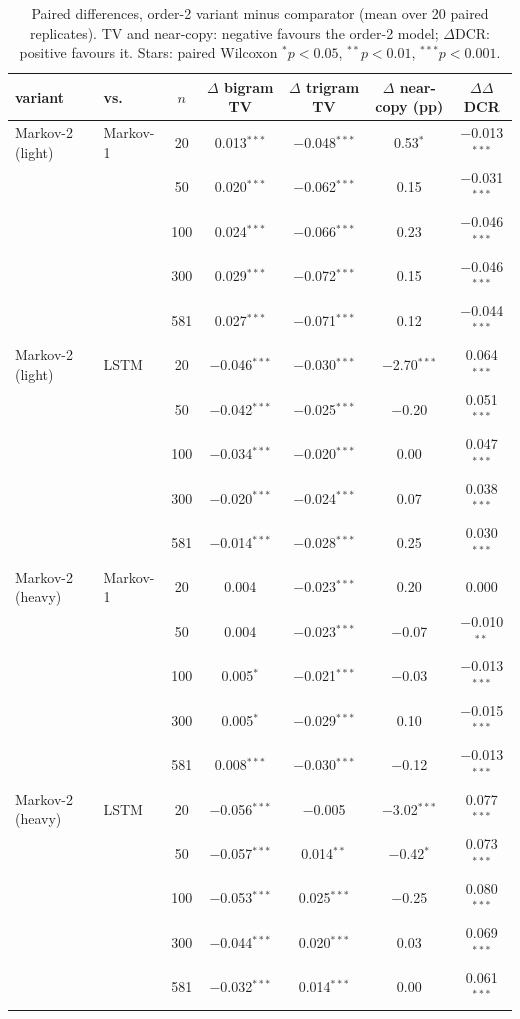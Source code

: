 \begin{table}[!t]
\caption{Paired differences, order-2 variant minus comparator (mean over 20 paired replicates). TV and near-copy: negative favours the order-2 model; $\Delta$DCR: positive favours it. Stars: paired Wilcoxon $^{*}p{<}0.05$, $^{**}p{<}0.01$, $^{***}p{<}0.001$.}
\label{tab:supp-order2-paired}
\centering\small
\begin{tabular}{llccccc}
\toprule
variant & vs. & $n$ & $\Delta$ bigram TV & $\Delta$ trigram TV & $\Delta$ near-copy (pp) & $\Delta\Delta$DCR \\
\midrule
Markov-2 (light) & Markov-1 & 20 & 0.013$^{***}$ & $-$0.048$^{***}$ & 0.53$^{*}$ & $-$0.013$^{***}$ \\
 &  & 50 & 0.020$^{***}$ & $-$0.062$^{***}$ & 0.15 & $-$0.031$^{***}$ \\
 &  & 100 & 0.024$^{***}$ & $-$0.066$^{***}$ & 0.23 & $-$0.046$^{***}$ \\
 &  & 300 & 0.029$^{***}$ & $-$0.072$^{***}$ & 0.15 & $-$0.046$^{***}$ \\
 &  & 581 & 0.027$^{***}$ & $-$0.071$^{***}$ & 0.12 & $-$0.044$^{***}$ \\
\midrule
Markov-2 (light) & LSTM & 20 & $-$0.046$^{***}$ & $-$0.030$^{***}$ & $-$2.70$^{***}$ & 0.064$^{***}$ \\
 &  & 50 & $-$0.042$^{***}$ & $-$0.025$^{***}$ & $-$0.20 & 0.051$^{***}$ \\
 &  & 100 & $-$0.034$^{***}$ & $-$0.020$^{***}$ & 0.00 & 0.047$^{***}$ \\
 &  & 300 & $-$0.020$^{***}$ & $-$0.024$^{***}$ & 0.07 & 0.038$^{***}$ \\
 &  & 581 & $-$0.014$^{***}$ & $-$0.028$^{***}$ & 0.25 & 0.030$^{***}$ \\
\midrule
Markov-2 (heavy) & Markov-1 & 20 & 0.004 & $-$0.023$^{***}$ & 0.20 & 0.000 \\
 &  & 50 & 0.004 & $-$0.023$^{***}$ & $-$0.07 & $-$0.010$^{**}$ \\
 &  & 100 & 0.005$^{*}$ & $-$0.021$^{***}$ & $-$0.03 & $-$0.013$^{***}$ \\
 &  & 300 & 0.005$^{*}$ & $-$0.029$^{***}$ & 0.10 & $-$0.015$^{***}$ \\
 &  & 581 & 0.008$^{***}$ & $-$0.030$^{***}$ & $-$0.12 & $-$0.013$^{***}$ \\
\midrule
Markov-2 (heavy) & LSTM & 20 & $-$0.056$^{***}$ & $-$0.005 & $-$3.02$^{***}$ & 0.077$^{***}$ \\
 &  & 50 & $-$0.057$^{***}$ & 0.014$^{**}$ & $-$0.42$^{*}$ & 0.073$^{***}$ \\
 &  & 100 & $-$0.053$^{***}$ & 0.025$^{***}$ & $-$0.25 & 0.080$^{***}$ \\
 &  & 300 & $-$0.044$^{***}$ & 0.020$^{***}$ & 0.03 & 0.069$^{***}$ \\
 &  & 581 & $-$0.032$^{***}$ & 0.014$^{***}$ & 0.00 & 0.061$^{***}$ \\
\bottomrule
\end{tabular}
\end{table}

